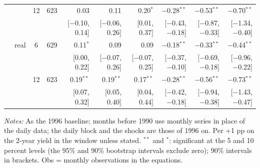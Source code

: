 \begin{longtable}{llcrrrrrrr}
 &  & 12 & 623 & 0.03 & 0.11 & 0.20$^{*}$ & $-$0.28$^{**}$ & $-$0.53$^{**}$ & $-$0.70$^{**}$\\
 & & & & {\scriptsize [$-$0.10, 0.14]} & {\scriptsize [$-$0.06, 0.26]} & {\scriptsize [0.01, 0.37]} & {\scriptsize [$-$0.43, $-$0.18]} & {\scriptsize [$-$0.87, $-$0.33]} & {\scriptsize [$-$1.34, $-$0.40]}\\
 & real & 6 & 629 & 0.11$^{*}$ & 0.09 & 0.09 & $-$0.18$^{**}$ & $-$0.33$^{**}$ & $-$0.44$^{**}$\\
 & & & & {\scriptsize [0.00, 0.22]} & {\scriptsize [$-$0.07, 0.26]} & {\scriptsize [$-$0.07, 0.25]} & {\scriptsize [$-$0.37, $-$0.10]} & {\scriptsize [$-$0.69, $-$0.18]} & {\scriptsize [$-$0.96, $-$0.22]}\\
 &  & 12 & 623 & 0.19$^{**}$ & 0.19$^{**}$ & 0.17$^{**}$ & $-$0.28$^{**}$ & $-$0.56$^{**}$ & $-$0.73$^{**}$\\
 & & & & {\scriptsize [0.07, 0.32]} & {\scriptsize [0.05, 0.40]} & {\scriptsize [0.04, 0.44]} & {\scriptsize [$-$0.42, $-$0.18]} & {\scriptsize [$-$0.94, $-$0.38]} & {\scriptsize [$-$1.43, $-$0.47]}\\
\end{longtable}
\begin{flushleft}\footnotesize\textit{Notes:} As the 1996 baseline; months before 1990 use monthly series in place of the daily data; the daily block and the shocks are those of 1996 on. Per +1 pp on the 2-year yield in the window unless stated. $^{**}$ and $^{*}$: significant at the 5 and 10 percent levels (the 95\% and 90\% bootstrap intervals exclude zero); 90\% intervals in brackets. Obs = monthly observations in the equations.\end{flushleft}
\endgroup
